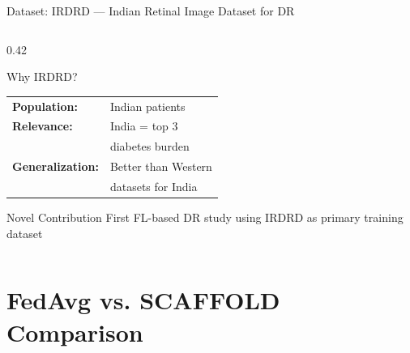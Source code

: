 \documentclass[aspectratio=169, 11pt]{beamer}
\begin{document}
\begin{frame}{Dataset: IRDRD --- Indian Retinal Image Dataset for DR}
\begin{columns}[T]
\begin{column}{0.42\textwidth}
\begin{block}{Why IRDRD?}
\begin{tabular}{ll}
          \textbf{Population:}    & Indian patients \\
          \textbf{Relevance:}     & India = top 3 \\
                                  & diabetes burden \\
          \textbf{Generalization:} & Better than Western \\
                                  & datasets for India \\
        \end{tabular}
      \end{block}
      \begin{alertblock}{Novel Contribution}\small
        First FL-based DR study using IRDRD as primary training dataset
      \end{alertblock}
    \end{column}
  \end{columns}
\end{frame}

\section{FedAvg vs. SCAFFOLD Comparison}
\end{document}

